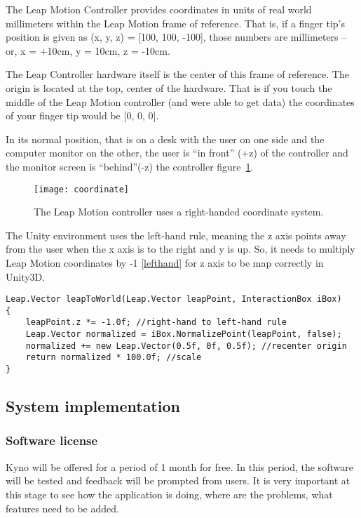 {\begin{itemize}
The Leap Motion Controller provides coordinates in units of real world millimeters within the Leap Motion frame of reference. That is, if a finger tip’s position is given as (x, y, z) = [100, 100, -100], those numbers are millimeters – or, x = +10cm, y = 10cm, z = -10cm.

The Leap Controller hardware itself is the center of this frame of reference. The origin is located at the top, center of the hardware. That is if you touch the middle of the Leap Motion controller (and were able to get data) the coordinates of your finger tip would be [0, 0, 0].


In its normal position, that is on a desk with the user on one side and the computer monitor on the other, the user is “in front” (+z) of the controller and the monitor screen is “behind”(-z) the controller \mbox{figure \ref{coordinate}}. 

 
\begin{figure}[!h]
\centering
\texttt{[image: coordinate]}
\caption{The Leap Motion controller uses a right-handed coordinate system. \cite{coordinates}}\label{coordinate}
\end{figure}


The Unity environment uses the left-hand rule, meaning the z axis points away from the user when the x axis is to the right and y is up. So, it needs to multiply Leap Motion coordinates by -1 \autoref{lefthand} for z axis to be map correctly in Unity3D.

\begin{lstlisting}[caption={Mapping right hand to left hand rule.},label={lefthand}]
Leap.Vector leapToWorld(Leap.Vector leapPoint, InteractionBox iBox)
{
    leapPoint.z *= -1.0f; //right-hand to left-hand rule
    Leap.Vector normalized = iBox.NormalizePoint(leapPoint, false);
    normalized += new Leap.Vector(0.5f, 0f, 0.5f); //recenter origin
    return normalized * 100.0f; //scale
}

\end{lstlisting}
\end{itemize}


\subsection{System implementation}


\subsubsection{Software license}
Kyno will be offered for a period of 1 month for free. In this period, the software will be tested and feedback will be prompted from users. It is very important at this stage to see how the application is doing, where are the problems, what features need to be added. 

}
